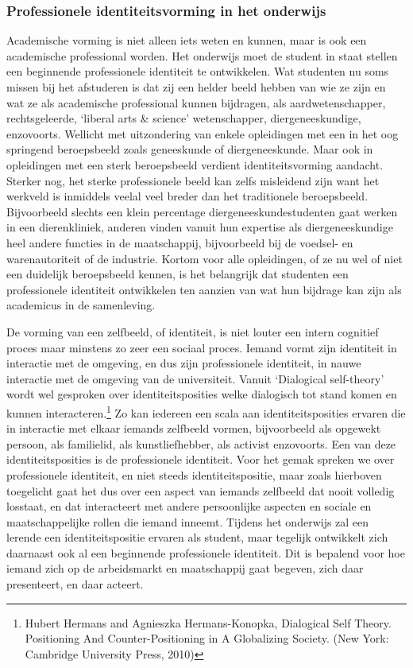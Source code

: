 \documentclass[empirical, authordate, ]{new-jote-article}
\begin{document}
	\subsubsection{Professionele identiteitsvorming in het onderwijs}



	Academische vorming is niet alleen iets weten en kunnen, maar is ook een academische professional worden. Het onderwijs moet de student in staat stellen een beginnende professionele identiteit te ontwikkelen. Wat studenten nu soms missen bij het afstuderen is dat zij een helder beeld hebben van wie ze zijn en wat ze als academische professional kunnen bijdragen, als aardwetenschapper, rechtsgeleerde, ‘liberal arts \& science' wetenschapper, diergeneeskundige, enzovoorts. Wellicht met uitzondering van enkele opleidingen met een in het oog springend beroepsbeeld zoals geneeskunde of diergeneeskunde. Maar ook in opleidingen met een sterk beroepsbeeld verdient identiteitsvorming aandacht. Sterker nog, het sterke professionele beeld kan zelfs misleidend zijn want het werkveld is inmiddels veelal veel breder dan het traditionele beroepsbeeld. Bijvoorbeeld slechts een klein percentage diergeneeskundestudenten gaat werken in een dierenkliniek, anderen vinden vanuit hun expertise als diergeneeskundige heel andere functies in de maatschappij, bijvoorbeeld bij de voedsel- en warenautoriteit of de industrie. Kortom voor alle opleidingen, of ze nu wel of niet een duidelijk beroepsbeeld kennen, is het belangrijk dat studenten een professionele identiteit ontwikkelen ten aanzien van wat hun bijdrage kan zijn als academicus in de samenleving.



	De vorming van een zelfbeeld, of identiteit, is niet louter een intern cognitief proces maar minstens zo zeer een sociaal proces. Iemand vormt zijn identiteit in interactie met de omgeving, en dus zijn professionele identiteit, in nauwe interactie met de omgeving van de universiteit. Vanuit ‘Dialogical self-theory' wordt wel gesproken over identiteitsposities welke dialogisch tot stand komen en kunnen interacteren.\footnote{Hubert Hermans and Agnieszka Hermans-Konopka, Dialogical Self Theory. Positioning And Counter-Positioning in A Globalizing Society. (New York: Cambridge University Press, 2010)} Zo kan iedereen een scala aan identiteitsposities ervaren die in interactie met elkaar iemands zelfbeeld vormen, bijvoorbeeld als opgewekt persoon, als familielid, als kunstliefhebber, als activist enzovoorts. Een van deze identiteitsposities is de professionele identiteit. Voor het gemak spreken we over professionele identiteit, en niet steeds identiteitspositie, maar zoals hierboven toegelicht gaat het dus over een aspect van iemands zelfbeeld dat nooit volledig losstaat, en dat interacteert met andere persoonlijke aspecten en sociale en maatschappelijke rollen die iemand inneemt. Tijdens het onderwijs zal een lerende een identiteitspositie ervaren als student, maar tegelijk ontwikkelt zich daarnaast ook al een beginnende professionele identiteit. Dit is bepalend voor hoe iemand zich op de arbeidsmarkt en maatschappij gaat begeven, zich daar presenteert, en daar acteert.
\end{document}
